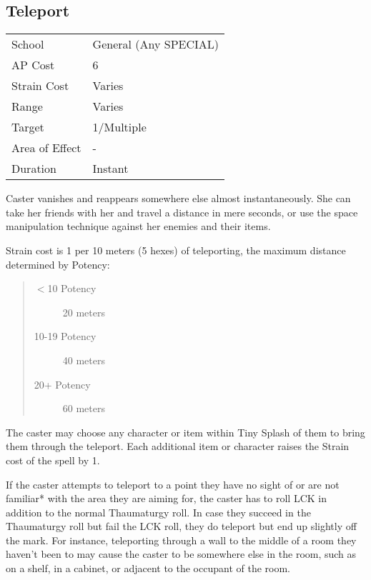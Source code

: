 \documentclass[11pt,a4paper,twocolumn]{book}
\begin{document}
\newpage

\subsection*{Teleport}
{
	\begin{tabu} to 75mm{| X[l,4] | X[l,7] |}
		\hline
		School 			& General (Any SPECIAL) 		\\
		AP Cost	      	& 6 						    \\
		Strain Cost     & Varies 						\\
		Range     		& Varies					    \\
		Target      	& 1/Multiple					\\
		Area of Effect  & - 	 						\\
		Duration     	& Instant						\\ \hline
	\end{tabu}
	
}

\medskip

Caster vanishes and reappears somewhere else almost instantaneously. She can take her friends with her and travel a distance in mere seconds, or use the space manipulation technique against her enemies and their items.

Strain cost is 1 per 10 meters (5 hexes) of teleporting, the maximum distance determined by Potency:
\begin{quote}
	\begin{description}
		\item[$<$10 Potency] 	20 meters
		\item[10-19 Potency] 	40 meters
		\item[20+ Potency] 		60 meters
	\end{description}
\end{quote}

The caster may choose any character or item within Tiny Splash of them to bring them through the teleport. Each additional item or character raises the Strain cost of the spell by 1.

If the caster attempts to teleport to a point they have no sight of or are not familiar* with the area they are aiming for, the caster has to roll LCK in addition to the normal Thaumaturgy roll. In case they succeed in the Thaumaturgy roll but fail the LCK roll, they do teleport but end up slightly off the mark. For instance, teleporting through a wall to the middle of a room they haven't been to may cause the caster to be somewhere else in the room, such as on a shelf, in a cabinet, or adjacent to the occupant of the room.
\end{document}
